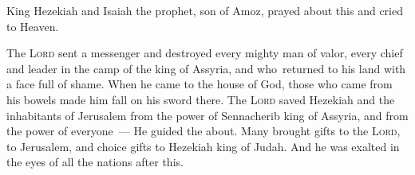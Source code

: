 \begin{inparaenum}
     King Hezekiah and Isaiah the prophet, son of Amoz, prayed about this and cried to Heaven.%
    
     The \textsc{Lord} sent a messenger and destroyed every mighty man of valor, every chief and leader in the camp of the king of Assyria, and who\understood\ returned to his land with a face full of shame. When he came to the house of God, those who came from his bowels made him fall on his sword there.%
     The \textsc{Lord} saved Hezekiah and the inhabitants of Jerusalem from the power of Sennacherib king of Assyria, and from the power of everyone~--- He guided the about.%
     Many brought gifts to the \textsc{Lord}, to Jerusalem, and choice gifts to Hezekiah king of Judah. And he was exalted in the eyes of all the nations after this.%
    

\end{inparaenum}
